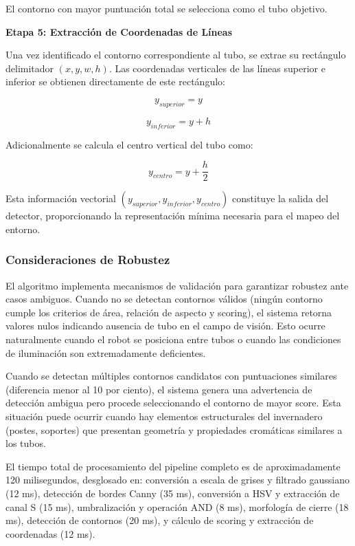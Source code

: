 El contorno con mayor puntuación total se selecciona como el tubo objetivo.

\textbf{Etapa 5: Extracción de Coordenadas de Líneas}

Una vez identificado el contorno correspondiente al tubo, se extrae su rectángulo delimitador $(x, y, w, h)$. Las coordenadas verticales de las líneas superior e inferior se obtienen directamente de este rectángulo:

\begin{equation}
y_{superior} = y
\end{equation}

\begin{equation}
y_{inferior} = y + h
\end{equation}

Adicionalmente se calcula el centro vertical del tubo como:

\begin{equation}
y_{centro} = y + \frac{h}{2}
\end{equation}

Esta información vectorial $(y_{superior}, y_{inferior}, y_{centro})$ constituye la salida del detector, proporcionando la representación mínima necesaria para el mapeo del entorno.

\subsubsection{Consideraciones de Robustez}

El algoritmo implementa mecanismos de validación para garantizar robustez ante casos ambiguos. Cuando no se detectan contornos válidos (ningún contorno cumple los criterios de área, relación de aspecto y scoring), el sistema retorna valores nulos indicando ausencia de tubo en el campo de visión. Esto ocurre naturalmente cuando el robot se posiciona entre tubos o cuando las condiciones de iluminación son extremadamente deficientes.

Cuando se detectan múltiples contornos candidatos con puntuaciones similares (diferencia menor al 10 por ciento), el sistema genera una advertencia de detección ambigua pero procede seleccionando el contorno de mayor score. Esta situación puede ocurrir cuando hay elementos estructurales del invernadero (postes, soportes) que presentan geometría y propiedades cromáticas similares a los tubos.

El tiempo total de procesamiento del pipeline completo es de aproximadamente 120 milisegundos, desglosado en: conversión a escala de grises y filtrado gaussiano (12 ms), detección de bordes Canny (35 ms), conversión a HSV y extracción de canal S (15 ms), umbralización y operación AND (8 ms), morfología de cierre (18 ms), detección de contornos (20 ms), y cálculo de scoring y extracción de coordenadas (12 ms).
